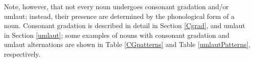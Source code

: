 Note, however, that not every noun undergoes consonant gradation and/or umlaut; instead, their presence are determined by the phonological form of a noun. Consonant gradation is described in detail in Section \ref{Cgrad}, and umlaut in Section \ref{umlaut}; some examples of nouns with consonant gradation and umlaut alternations are shown in Table \vref{CGpatterns} and Table \vref{umlautPatterns}, respectively. 


